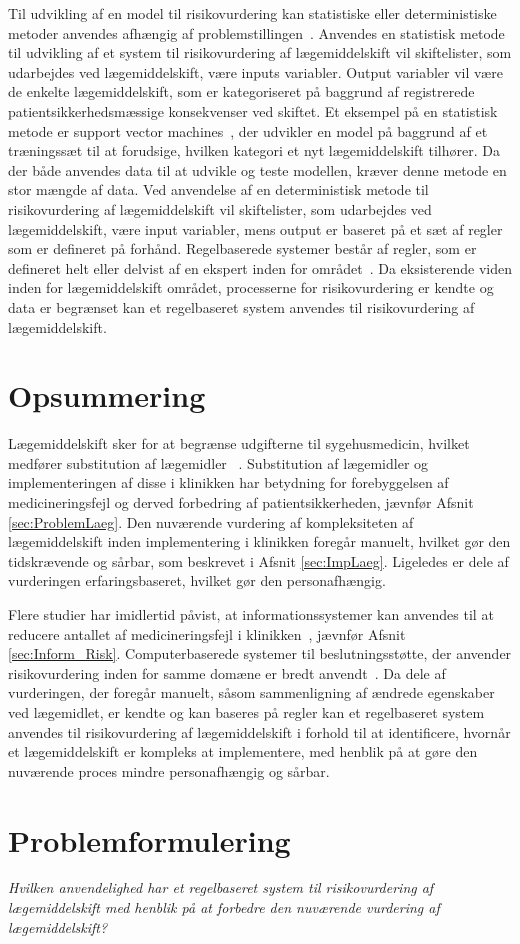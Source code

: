 Til udvikling af en model til risikovurdering kan statistiske eller deterministiske metoder anvendes afhængig af problemstillingen~\citep{Boyko1990,Kirchsteiger1999}. Anvendes en statistisk metode til udvikling af et system til risikovurdering af lægemiddelskift vil skiftelister, som udarbejdes ved lægemiddelskift, være inputs variabler. Output variabler vil være de enkelte lægemiddelskift, som er kategoriseret på baggrund af registrerede patientsikkerhedsmæssige konsekvenser ved skiftet. Et eksempel på en statistisk metode er support vector machines~\citep{Koivu2018}, der udvikler en model på baggrund af et træningssæt til at forudsige, hvilken kategori et nyt lægemiddelskift tilhører. Da der både anvendes data til at udvikle og teste modellen, kræver denne metode en stor mængde af data. Ved anvendelse af en deterministisk metode til risikovurdering af lægemiddelskift vil skiftelister, som udarbejdes ved lægemiddelskift, være input variabler, mens output er baseret på et sæt af regler som er defineret på forhånd. Regelbaserede systemer består af regler, som er defineret helt eller delvist af en ekspert inden for området~\citep{Crina2008}. Da eksisterende viden inden for lægemiddelskift området, processerne for risikovurdering er kendte og data er begrænset kan et regelbaseret system anvendes til risikovurdering af lægemiddelskift. 

\section{Opsummering}
Lægemiddelskift sker for at begrænse udgifterne til sygehusmedicin, hvilket medfører substitution af lægemidler ~\citep{Ess2003, Johnston2011}. Substitution af lægemidler og implementeringen af disse i klinikken har betydning for forebyggelsen af medicineringsfejl og derved forbedring af patientsikkerheden, jævnfør Afsnit \ref{sec:ProblemLaeg}. Den nuværende vurdering af kompleksiteten af lægemiddelskift inden implementering i klinikken foregår manuelt, hvilket gør den tidskrævende og sårbar, som beskrevet i Afsnit \ref{sec:ImpLaeg}. Ligeledes er dele af vurderingen erfaringsbaseret, hvilket gør den personafhængig.

Flere studier har imidlertid påvist, at informationssystemer kan anvendes til at reducere antallet af medicineringsfejl i klinikken~\citep{Agrawal2009, Stenner2010, Fischer2008, Simpson2008}, jævnfør Afsnit \ref{sec:Inform_Risk}. Computerbaserede systemer til beslutningsstøtte, der anvender risikovurdering inden for samme domæne er bredt anvendt~\citep{Geissert2018, Rawshani2018,Barbar2010, Koivu2018}. Da dele af vurderingen, der foregår manuelt, såsom sammenligning af ændrede egenskaber ved lægemidlet, er kendte og kan baseres på regler kan et regelbaseret system anvendes til risikovurdering af lægemiddelskift i forhold til at identificere, hvornår et lægemiddelskift er kompleks at implementere, med henblik på at gøre den nuværende proces mindre personafhængig og sårbar. 

\section{Problemformulering}
\textit{Hvilken anvendelighed har et regelbaseret system til risikovurdering af lægemiddelskift med henblik på at forbedre den nuværende vurdering af lægemiddelskift?}


